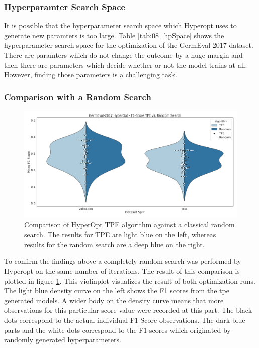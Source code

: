 \subsubsection*{Hyperparamter Search Space}

It is possible that the hyperparameter search space which Hyperopt uses to generate new paramters is too large. Table \ref{tab:08_hpSpace} shows the hyperparameter search space for the optimization of the GermEval-2017 dataset. There are paramters which do not change the outcome by a huge margin and then there are parameters which decide whether or not the model trains at all. However, finding those parameters is a challenging task.

\subsubsection*{Comparison with a Random Search}

\begin{figure}[ht]
	\centering
	\includegraphics[width=\textwidth]{figures/06_results/06_hp_ge_vio_tpeRand}
	\caption{Comparison of HyperOpt TPE algorithm against a classical random search. The results for TPE are light blue on the left, whereas results for the random search are a deep blue on the right.}
	\label{fig:06_HpOptimTpe_Rand}
\end{figure}

To confirm the findings above a completely random search was performed by Hyperopt on the same number of iterations. The result of this comparison is plotted in figure \ref{fig:06_HpOptimTpe_Rand}. This violinplot visualizes the result of both optimization runs. The light blue density curve on the left shows the F1 scores from the \gls{tpe} generated models. A wider body on the density curve means that more observations for this particular score value were recorded at this part. The black dots correspond to the actual individual F1-Score observations. The dark blue parts and the white dots correspond to the F1-scores which originated by randomly generated hyperparameters.

